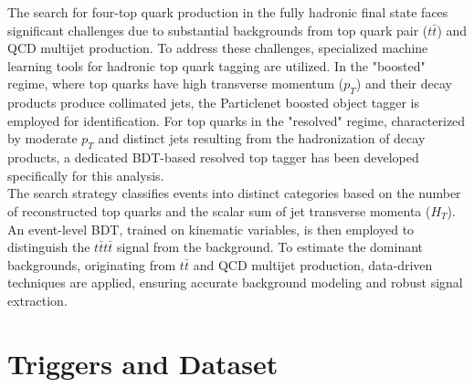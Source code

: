 \documentclass[twoside]{article}
\begin{document}
The search for four-top quark production in the fully hadronic final state faces significant challenges due to substantial backgrounds from top quark pair (\(t\bar{t}\)) and QCD multijet production. To address these challenges, specialized machine learning tools for hadronic top quark tagging are utilized. In the "boosted" regime, where top quarks have high transverse momentum (\(p_T\)) and their decay products produce collimated jets, the Particlenet boosted object tagger is employed for identification. For top quarks in the "resolved" regime, characterized by moderate \(p_T\) and distinct jets resulting from the hadronization of decay products, a dedicated BDT-based resolved top tagger has been developed specifically for this analysis.\\

The search strategy classifies events into distinct categories based on the number of reconstructed top quarks and the scalar sum of jet transverse momenta (\(H_T\)). An event-level BDT, trained on kinematic variables, is then employed to distinguish the \(t\bar{t}t\bar{t}\) signal from the background. To estimate the dominant backgrounds, originating from \(t\bar{t}\) and QCD multijet production, data-driven techniques are applied, ensuring accurate background modeling and robust signal extraction.

\clearpage
\section{Triggers and Dataset}
\label{sec:trigger}
\end{document}
